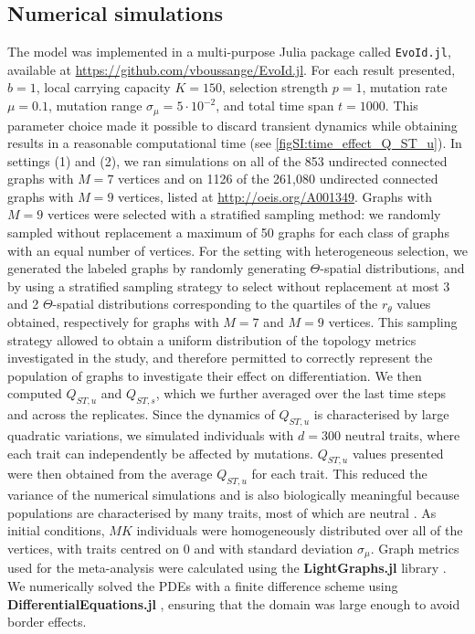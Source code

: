 \subsection{Numerical simulations}
The model was implemented in a multi-purpose Julia package called \texttt{EvoId.jl}, available at \href{https://github.com/vboussange/EvoId.jl}{https://github.com/vboussange/EvoId.jl}. For each result presented, $b = 1$, local carrying capacity $K = 150$, selection strength $p = 1$, mutation rate $\mu=0.1$, mutation range $\sigma_\mu = 5 \cdot 10^{-2}$, and total time span $t = 1000$. This parameter choice made it possible to discard transient dynamics while obtaining results in a reasonable computational time (see \cref{figSI:time_effect_Q_ST_u}).
%
In settings (1) and (2), we ran simulations on all of the 853 undirected connected graphs with $M=7$ vertices and on 1126 of the 261,080 undirected connected graphs with $M=9$ vertices, listed at \href{http://oeis.org/A001349}{http://oeis.org/A001349}. Graphs with $M = 9$ vertices were selected with a stratified sampling method: we randomly sampled without replacement a maximum of 50 graphs for each class of graphs with an equal number of vertices. For the setting with heterogeneous selection, we generated the labeled graphs by randomly generating $\Theta$-spatial distributions, and by using a stratified sampling strategy to select without replacement at most 3 and 2 $\Theta$-spatial distributions corresponding to the quartiles of the $r_\theta$ values obtained, respectively for graphs with $M=7$ and $M=9$ vertices. This sampling strategy allowed to obtain a uniform distribution of the topology metrics investigated in the study, and therefore permitted to correctly represent the population of graphs to investigate their effect on differentiation.
%
We then computed $Q_{ST,u}$ and $Q_{ST,s}$, which we further averaged over the last time steps and across the replicates.
%
Since the dynamics of $Q_{ST,u}$ is characterised by large quadratic variations, we simulated individuals with $d = 300$ neutral traits, where each trait can independently be affected by mutations. $Q_{ST,u}$ values presented were then obtained from the average $Q_{ST,u}$ for each trait. This reduced the variance of the numerical simulations and is also biologically meaningful because populations are characterised by many traits, most of which are neutral \citep{Holderegger2006}.
%
As initial conditions, $MK$ individuals were homogeneously distributed over all of the vertices, with traits centred on 0 and with standard deviation $\sigma_\mu$.
%
Graph metrics used for the meta-analysis were calculated using the \textbf{LightGraphs.jl} library \citep{Bromberger2017}. We numerically solved the PDEs with a finite difference scheme using \textbf{DifferentialEquations.jl} \citep{Rackauckas2017}, ensuring that the domain was large enough to avoid border effects.

